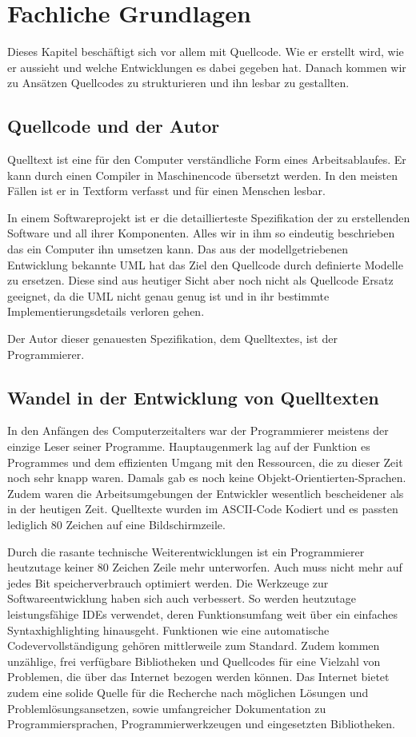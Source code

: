 
\section{Fachliche Grundlagen}

Dieses Kapitel beschäftigt sich vor allem mit Quellcode.
Wie er erstellt wird, wie er aussieht und welche Entwicklungen es dabei gegeben hat.
Danach kommen wir zu Ansätzen Quellcodes zu strukturieren und ihn lesbar zu gestallten.

\subsection{Quellcode und der Autor}

Quelltext ist eine für den Computer verständliche Form
eines Arbeitsablaufes. Er kann durch einen Compiler in Maschinencode übersetzt werden.
In den meisten Fällen ist er in Textform verfasst und für einen Menschen lesbar.

In einem Softwareprojekt ist er die detaillierteste Spezifikation der zu erstellenden
Software und all ihrer Komponenten. Alles wir in ihm so eindeutig beschrieben
das ein Computer ihn umsetzen kann. Das aus der modellgetriebenen Entwicklung
bekannte UML hat das Ziel den Quellcode durch definierte Modelle zu ersetzen.
Diese sind aus heutiger Sicht aber noch nicht als Quellcode Ersatz geeignet,
da die UML nicht genau genug ist und in ihr bestimmte Implementierungsdetails verloren gehen.
 \cite[S. 26]{Martin}

Der Autor dieser genauesten Spezifikation, dem Quelltextes, ist der Programmierer.

\subsection{Wandel in der Entwicklung von Quelltexten}


In den Anfängen des Computerzeitalters war der Programmierer meistens der einzige
Leser seiner Programme. Hauptaugenmerk lag auf der Funktion es Programmes
und dem effizienten Umgang mit den Ressourcen, die zu dieser Zeit noch sehr knapp waren.
 Damals gab es noch keine Objekt-Orientierten-Sprachen. Zudem waren die Arbeitsumgebungen der Entwickler
wesentlich bescheidener als in der heutigen Zeit. Quelltexte wurden im ASCII-Code
Kodiert und es passten lediglich 80 Zeichen auf eine Bildschirmzeile.

Durch die rasante technische Weiterentwicklungen ist ein Programmierer heutzutage keiner
80 Zeichen Zeile mehr unterworfen. Auch muss nicht mehr auf jedes Bit speicherverbrauch
optimiert werden. Die Werkzeuge zur Softwareentwicklung haben sich auch verbessert. So
werden heutzutage leistungsfähige IDEs verwendet, deren Funktionsumfang weit über ein
einfaches Syntaxhighlighting hinausgeht. Funktionen wie eine automatische Codevervollständigung
gehören mittlerweile zum Standard. Zudem kommen unzählige, frei verfügbare Bibliotheken und Quellcodes
für eine Vielzahl von Problemen, die über das Internet bezogen werden können. Das Internet bietet zudem
eine solide Quelle für die Recherche nach möglichen Lösungen und Problemlösungsansetzen, sowie
umfangreicher Dokumentation zu Programmiersprachen, Programmierwerkzeugen und eingesetzten Bibliotheken.

